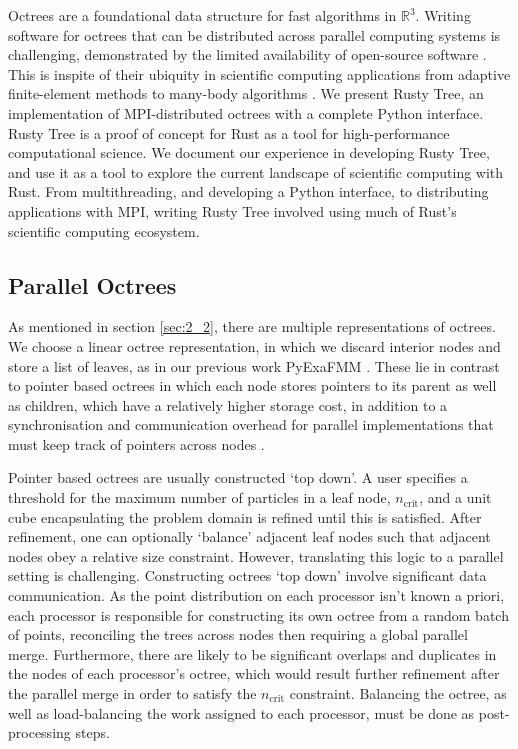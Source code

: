 Octrees are a foundational data structure for fast algorithms in $\mathbb{R}^3$. Writing software for octrees that can be distributed across parallel computing systems is challenging, demonstrated by the limited availability of open-source software \cite{BursteddeWilcoxGhattas11,fernando2020github}. This is inspite of their ubiquity in scientific computing applications from adaptive finite-element methods to many-body algorithms \cite{sundar2008bottom}. We present Rusty Tree, an implementation of MPI-distributed octrees with a complete Python interface. Rusty Tree is a proof of concept for Rust as a tool for high-performance computational science. We document our experience in developing Rusty Tree, and use it as a tool to explore the current landscape of scientific computing with Rust. From multithreading, and developing a Python interface, to distributing applications with MPI, writing Rusty Tree involved using much of Rust's scientific computing ecosystem. 

\subsection*{Parallel Octrees}

As mentioned in section \ref{sec:2_2}, there are multiple representations of octrees. We choose a linear octree representation, in which we discard interior nodes and store a list of leaves, as in our previous work PyExaFMM \cite{kailasa2022pyexafmm}. These lie in contrast to pointer based octrees in which each node stores pointers to its parent as well as children, which have a relatively higher storage cost, in addition to a synchronisation and communication overhead for parallel implementations that must keep track of pointers across nodes \cite{tu2005scalable}. 

Pointer based octrees are usually constructed `top down'. A user specifies a threshold for the maximum number of particles in a leaf node, $n_{\text{crit}}$, and a unit cube encapsulating the problem domain is refined until this is satisfied. After refinement, one can optionally `balance' adjacent leaf nodes such that adjacent nodes obey a relative size constraint. However, translating this logic to a parallel setting is challenging. Constructing octrees `top down' involve significant data communication. As the point distribution on each processor isn't known a priori, each processor is responsible for constructing its own octree from a random batch of points, reconciling the trees across nodes then requiring a global parallel merge. Furthermore, there are likely to be significant overlaps and duplicates in the nodes of each processor's octree, which would result further refinement after the parallel merge in order to satisfy the $n_{\text{crit}}$ constraint. Balancing the octree, as well as load-balancing the work assigned to each processor, must be done as post-processing steps.

